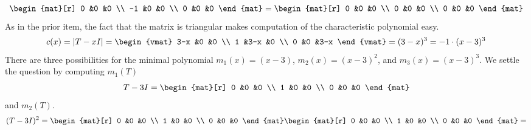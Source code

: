 \begin{exercises}
\begin{answer}
\begin{exparts}
\begin{multline*}
           \begin{mat}[r]
              0  &0  &0  \\
             -1  &0  &0  \\
              0  &0  &0
           \end{mat}
           =
           \begin{mat}[r]
             0  &0  &0  \\
             0  &0  &0  \\
             0  &0  &0
           \end{mat}
         \end{multline*}
       \partsitem As in the prior item, the fact that the matrix is 
        triangular makes computation of the characteristic polynomial
        easy.
        \begin{equation*}
          c(x)=\deter{T-xI}
              =
              \begin{vmat}
                3-x  &0   &0   \\
                1    &3-x &0   \\
                0    &0   &3-x
              \end{vmat}
              =(3-x)^3=-1\cdot (x-3)^3
        \end{equation*}
        There are three possibilities for the minimal polynomial
        $m_1(x)=(x-3)$, $m_2(x)=(x-3)^2$, and $m_3(x)=(x-3)^3$.
        We settle the question by computing $m_1(T)$
        \begin{equation*}
          T-3I=
          \begin{mat}[r]
            0  &0  &0  \\
            1  &0  &0  \\
            0  &0  &0
          \end{mat}
        \end{equation*}
        and $m_2(T)$.
        \begin{equation*}
          (T-3I)^2=
          \begin{mat}[r]
            0  &0  &0  \\
            1  &0  &0  \\
            0  &0  &0
          \end{mat}
          \begin{mat}[r]
            0  &0  &0  \\
            1  &0  &0  \\
            0  &0  &0
          \end{mat}
          =          

\end{equation*}
\end{exparts}
\end{answer}
\end{exercises}
